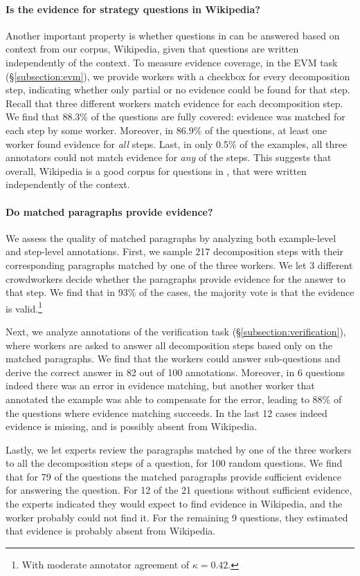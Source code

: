 {\paragraph{Is the evidence for strategy questions in Wikipedia?}
Another important property is whether questions in \strategyqa{} can be answered based on context from our corpus, Wikipedia, given that questions are written independently of the context. 
To measure evidence coverage, in the EVM task (\S\ref{subsection:evm}), we provide workers with a checkbox for every decomposition step, indicating whether only partial or no evidence could be found for that step. Recall that three different workers match evidence for each decomposition step.
We find that 88.3\% of the questions are fully covered: evidence was matched for each step by some worker.
Moreover, in 86.9\% of the questions, at least one worker found evidence  for \emph{all} steps. Last, in only 0.5\% of the examples, all three annotators could not match evidence for \emph{any} of the steps. 
This suggests that overall, Wikipedia is a good corpus for questions in \strategyqa{}, that were written independently of the context.

\paragraph{Do matched paragraphs provide evidence?}
We assess the quality of matched paragraphs by analyzing both example-level and step-level annotations.
First, we sample 217 decomposition steps with their corresponding paragraphs matched by one of the three workers. We let 3 different crowdworkers decide whether the paragraphs provide evidence for the answer to that step. We find that in 93\% of the cases, the majority vote is that the evidence is valid.\footnote{With moderate annotator agreement of $\kappa = 0.42$.}

Next, we analyze annotations of the verification task (\S\ref{subsection:verification}), where workers are asked to answer all decomposition steps based only on the matched paragraphs. We find that the workers could answer sub-questions and derive the correct answer in 82 out of 100 annotations. Moreover, in 6 questions indeed there was an error in evidence matching, but another worker that annotated the example was able to compensate for the error, leading to 88\% of the questions where evidence matching succeeds. In the last 12 cases indeed evidence is missing, and is possibly absent from Wikipedia.

Lastly, we let experts review the paragraphs matched by one of the three workers to all the decomposition steps of a question, for 100 random questions. We find that for 79 of the questions the matched paragraphs provide sufficient evidence for answering the question. 
For 12 of the 21 questions without sufficient evidence, the experts indicated they would expect to find evidence in Wikipedia, and the worker probably could not find it. For the remaining 9 questions, they estimated that evidence is probably absent from Wikipedia.

}

